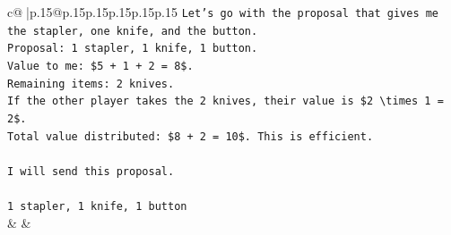 \documentclass{article}
\begin{document}
{\begin{supertabular}{c@{$\;$}|p{.15\linewidth}@{}p{.15\linewidth}p{.15\linewidth}p{.15\linewidth}p{.15\linewidth}p{.15\linewidth}}
{{{\texttt{Let's go with the proposal that gives me the stapler, one knife, and the button.} \\
\texttt{Proposal: 1 stapler, 1 knife, 1 button.} \\
\texttt{Value to me: \$5 + 1 + 2 = 8\$.} \\
\texttt{Remaining items: 2 knives.} \\
\texttt{If the other player takes the 2 knives, their value is \$2 \textbackslash{}times 1 = 2\$.} \\
\texttt{Total value distributed: \$8 + 2 = 10\$. This is efficient.} \\
\\ 
\texttt{I will send this proposal.} \\
\\ 
\texttt{1 stapler, 1 knife, 1 button} \\
            }
        }
    }
    & & \\ \\


\end{supertabular}}
\end{document}

